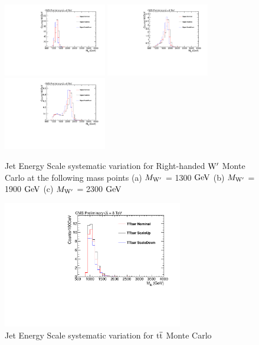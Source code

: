 \begin{figure}[htcb]
\begin{center}
\includegraphics[width=0.4\textwidth]{AN-13-004/figs/Signal_M1300_PtScaling}
\includegraphics[width=0.4\textwidth]{AN-13-004/figs/Signal_M1900_PtScaling}
\includegraphics[width=0.4\textwidth]{AN-13-004/figs/Signal_M2300_PtScaling}
\caption{
Jet Energy Scale systematic variation for Right-handed $\mathrm{W}^\prime$ Monte Carlo at the following mass points
(a) $M_{\mathrm{W}^\prime}$ = 1300$~\mathrm{GeV}$ 
(b) $M_{\mathrm{W}^\prime}$ = 1900$~\mathrm{GeV}$
(c) $M_{\mathrm{W}^\prime}$ = 2300$~\mathrm{GeV}$ 
}
\label{figs:signalJES}
\end{center}
\end{figure}

\begin{figure}[htcb]
\begin{center}
\includegraphics[width=0.7\textwidth]{AN-13-004/figs/TTbar_PtScaling}
\caption{Jet Energy Scale systematic variation for $\mathrm{t\overline{t}}$ Monte Carlo}
\label{figs:ttbarJES}
\end{center}
\end{figure}

